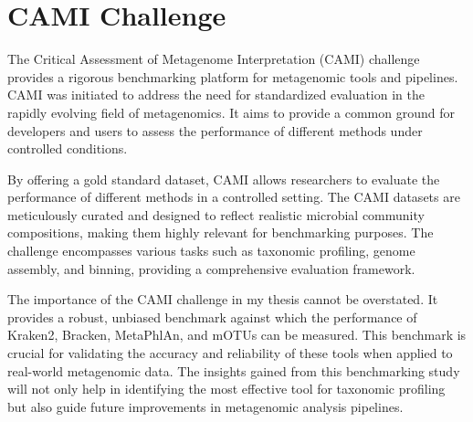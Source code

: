\section{CAMI Challenge}\label{sec:CAMI-challange}
The Critical Assessment of Metagenome Interpretation (CAMI) challenge provides a rigorous benchmarking platform for metagenomic tools and pipelines.
CAMI was initiated to address the need for standardized evaluation in the rapidly evolving field of metagenomics.
It aims to provide a common ground for developers and users to assess the performance of different methods under controlled conditions.

By offering a gold standard dataset, CAMI allows researchers to evaluate the performance of different methods in a controlled setting. 
The CAMI datasets are meticulously curated and designed to reflect realistic microbial community compositions, 
making them highly relevant for benchmarking purposes. The challenge encompasses various tasks such as taxonomic profiling, genome assembly,
and binning, providing a comprehensive evaluation framework.

The importance of the CAMI challenge in my thesis cannot be overstated. It provides a robust,
unbiased benchmark against which the performance of Kraken2, Bracken, MetaPhlAn, and mOTUs can be measured. 
This benchmark is crucial for validating the accuracy and reliability of these tools when applied to real-world metagenomic data. 
The insights gained from this benchmarking study will not only help in identifying the most effective tool 
for taxonomic profiling but also guide future improvements in metagenomic analysis pipelines.